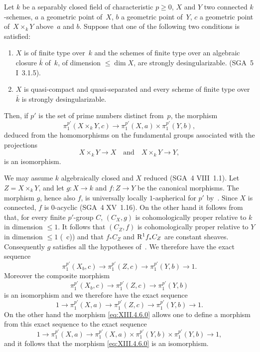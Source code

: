 \begin{proposition}
\label{XIII.4.6}
Let $k$ be a separably closed field of characteristic
$p\geq 0$, $X$ and $Y$ two connected $k$-schemes, $a$ a
geometric point of~$X$, $b$ a geometric point of~$Y$,
$c$ a geometric point of~$X\times_k Y$ above~$a$ and
$b$. Suppose that one of the following two conditions is satisfied:
\begin{enumerate}
\item[a)] $X$ is of finite type over~$k$ and the schemes of finite type
over an algebraic closure $\bar{k}$ of~$k$, of dimension
$\leq\dim X$, are strongly desingularizable. \textup{(SGA~5 I~3.1.5)}.
\item[b)] $X$ is quasi-compact and quasi-separated and every
scheme of finite type over~$\bar{k}$ is strongly
desingularizable.
\end{enumerate}

Then, if $p'$ is the set of prime numbers distinct from~$p$,
the morphism
\begin{equation*}
\label{eq:XIII.4.6.0} \tag{\thesubsection.0} {}
\pi_1^{p'}(X\times_k Y,c)\to\pi_1^{p'}(X,a)\times\pi_1^{p'}(Y,b),
\end{equation*}
deduced
from the homomorphisms on the fundamental groups associated with the
projections
$$
X\times_k Y\to X \quad \text{and} \quad X\times_k Y\to Y,
$$
is an isomorphism.
\end{proposition}

We may assume $k$ algebraically closed and $X$ reduced
(SGA~4 VIII~1.1). Let $Z=X\times_k Y$, and let $g\colon X\to k$ and $f\colon
Z\to Y$ be the canonical morphisms. The morphism $g$, hence also $f$,
is universally locally $1$-aspherical for $p'$
by~. Since $X$ is connected, $f$ is
$0$-acyclic (SGA~4 XV~1.16). On the other hand it follows
from~ that, for every finite $p'$-group $C$, $(C_X,g)$ is
cohomologically proper relative to $k$ in dimension $\leq
1$. It follows that $(C_Z,f)$ is cohomologically proper
relative to $Y$ in dimension $\leq 1$ (~c)) and
that $f_*C_Z$ and $\mathrm{R}^1f_*C_Z$ are constant sheaves. Consequently
$g$ satisfies all the hypotheses of~. We
therefore have the exact sequence
$$
\pi_1^{p'}(X_b,c)\to\pi_1^{p'}(Z,c)\to\pi_1^{p'}(Y,b)\to 1.
$$
Moreover the composite morphism
$$
\pi_1^{p'}(X_b,c)\to\pi_1^{p'}(Z,c)\to\pi_1^{p'}(Y,b)
$$
is an isomorphism and we therefore have the exact sequence
$$
1\to\pi_1^{p'}(X,a)\to\pi_1^{p'}(Z,c)\to\pi_1^{p'}(Y,b)\to 1.
$$
On the other hand the morphism \eqref{eq:XIII.4.6.0} allows one to define
a morphism from this exact sequence to the exact sequence
$$
1\to\pi_1^{p'}(X,a)\to
\pi_1^{p'}(X,a)\times\pi_1^{p'}(Y,b)\times\pi_1^{p'}(Y,b)\to 1,
$$
and it follows that the morphism \eqref{eq:XIII.4.6.0} is an
isomorphism.

